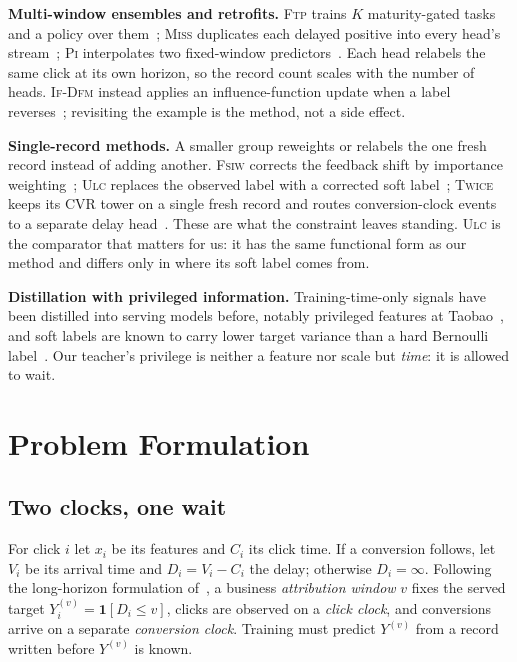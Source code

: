 \documentclass[runningheads]{llncs}
\newcommand{\ind}{\mathbf{1}}
\newcommand{\Yv}{Y^{(v)}}
\begin{document}
\smallskip\noindent\textbf{Multi-window ensembles and retrofits.} \textsc{Ftp} trains $K$
maturity-gated tasks and a policy over them~\cite{li2021follow}; \textsc{Miss} duplicates each
delayed positive into every head's stream~\cite{liu2024online}; \textsc{Pi} interpolates two
fixed-window predictors~\cite{zhang2025personalized}. Each head relabels the same click at its own
horizon, so the record count scales with the number of heads. \textsc{If-Dfm} instead applies an
influence-function update when a label reverses~\cite{ding2026delayed}; revisiting the example is
the method, not a side effect.

\smallskip\noindent\textbf{Single-record methods.} A smaller group reweights or relabels the one
fresh record instead of adding another. \textsc{Fsiw} corrects the feedback shift by importance
weighting~\cite{yasui2020feedback}; \textsc{Ulc} replaces the observed label with a corrected soft
label~\cite{wang2023unbiased}; \textsc{Twice} keeps its CVR tower on a single fresh record and
routes conversion-clock events to a separate delay head~\cite{li2026twice}. These are what the
constraint leaves standing. \textsc{Ulc} is the comparator that matters for us: it has the same
functional form as our method and differs only in where its soft label comes from.

\smallskip\noindent\textbf{Distillation with privileged information.} Training-time-only signals
have been distilled into serving models before, notably privileged features at
Taobao~\cite{xu2020privileged}, and soft labels are known to carry lower target variance than a hard
Bernoulli label~\cite{menon2021statistical}. Our teacher's privilege is neither a feature nor scale
but \emph{time}: it is allowed to wait.

\section{Problem Formulation}\label{sec:formulation}

\subsection{Two clocks, one wait}

For click $i$ let $x_i$ be its features and $C_i$ its click time. If a conversion follows, let $V_i$
be its arrival time and $D_i = V_i - C_i$ the delay; otherwise $D_i = \infty$. Following the
long-horizon formulation of~\cite{li2026twice}, a business \emph{attribution window} $v$ fixes the
served target $\Yv_i = \ind[D_i \le v]$, clicks are observed on a \emph{click clock}, and
conversions arrive on a separate \emph{conversion clock}. Training must predict $\Yv$ from a record
written before $\Yv$ is known.
\end{document}
